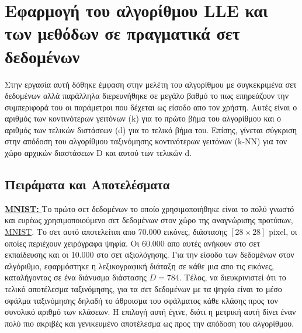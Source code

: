 \section{Εφαρμογή του αλγορίθμου \textlatin{LLE} και των μεθόδων σε πραγματικά σετ δεδομένων}
\par
Στην εργασία αυτή δόθηκε έμφαση στην μελέτη του αλγορίθμου με συγκεκριμένα σετ δεδομένων αλλά παράλληλα διερευνήθηκε σε μεγάλο βαθμό το πως επηρεάζουν την συμπεριφορά του οι παράμετροι που δέχεται ως είσοδο απο τον χρήστη. Αυτές είναι ο αριθμός των κοντινότερων γειτόνων \textlatin{(k)} για το πρώτο βήμα του αλγορίθμου και ο αριθμός των τελικών διστάσεων \textlatin{(d)} για το τελικό βήμα του. Επίσης, γίνεται σύγκριση στην απόδοση του αλγορίθμου ταξινόμησης κοντινότερων γειτόνων \textlatin{(k-NN)} για τον χώρο αρχικών διαστάσεων \textlatin{D} και αυτού των τελικών \textlatin{d}. 

\subsection{Πειράματα και Αποτελέσματα}
\par
\href{http://yann.lecun.com/exdb/mnist/}{\textbf{\textlatin{MNIST: }}}Το πρώτο σετ δεδομένων το οποίο χρησιμοποιήθηκε είναι το πολύ γνωστό και ευρέως χρησιμοποιούμενο σετ δεδομένων στον χώρο της αναγνώρισης προτύπων, \href{http://yann.lecun.com/exdb/mnist/}{\textlatin{MNIST}}. Το σετ αυτό αποτελείται απο 70.000 εικόνες, διάστασης $[28 \times 28]$ \textlatin{pixel}, οι οποίες περιέχουν χειρόγραφα ψηφία. Οι 60.000 απο αυτές ανήκουν στο σετ εκπαίδευσης και οι 10.000 στο σετ αξιολόγησης. Για την είσοδο των δεδομένων στον αλγόριθμο, εφαρμόστηκε η λεξικογραφική διάταξη σε κάθε μια απο τις εικόνες, καταλήγοντας σε ένα διάνυσμα διάστασης $D = 784$. Τέλος, να διευκρινιστεί ότι το τελικό αποτέλεσμα ταξινόμησης, για τα σετ δεδομένων με τα ψηφία είναι το μέσο σφάλμα ταξινόμησης δηλαδή το άθροισμα του σφάλματος κάθε κλάσης προς τον συνολικό αριθμό των κλάσεων. Η επιλογή αυτή έγινε, διότι η μετρική αυτή δίνει έναν πολύ πιο ακριβές και γενικευμένο αποτέλεσμα ως προς την απόδοση του αλγορίθμου.
 
